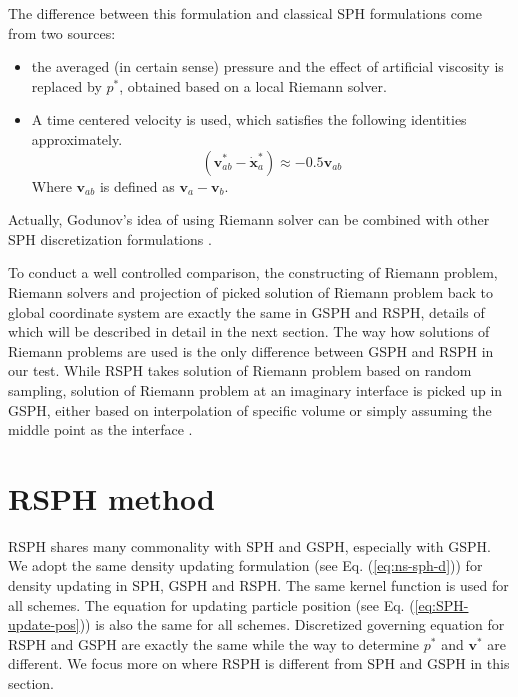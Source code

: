 \documentclass[review]{elsarticle}
\begin{document}
The difference between this formulation and classical SPH formulations come from two sources: 
\begin{itemize}
\item the averaged (in certain sense) pressure and the effect of artificial viscosity is replaced by  $p^{\ast}$, obtained based on a local Riemann solver.
\item A time centered velocity is used, which satisfies the following identities approximately. 
\begin{equation}
\left( \textbf{v}_{a b}^{\ast} - \dot{\textbf{x}}_{a}^{\ast} \right) \approx -0.5 \textbf{v}_{a b}
\label{eq:SPH-GSPH-difference2}
\end{equation}
Where $\textbf{v}_{a b}$ is defined as $\textbf{v}_a - \textbf{v}_b$.
\end{itemize}
Actually, Godunov's idea of using Riemann solver can be combined with other SPH discretization formulations \citep{cha2003implementations}. 

To conduct a well controlled comparison, the constructing of Riemann problem, Riemann solvers and projection of picked solution of Riemann problem back to global coordinate system are exactly the same in GSPH and RSPH, details of which will be described in detail in the next section. The way how solutions of Riemann problems are used is the only difference between GSPH and RSPH in our test. While RSPH takes solution of Riemann problem based on random sampling, solution of Riemann problem at an imaginary interface is picked up in GSPH, either based on interpolation of specific volume \citep{inutsuka2002reformulation} or simply assuming the middle point as the interface \citep{cha2003implementations}.


\section{RSPH method}
RSPH shares many commonality with SPH and GSPH, especially with GSPH. We adopt the same density updating formulation (see Eq. (\ref{eq:ns-sph-d})) for density updating in SPH, GSPH and RSPH. The same kernel function is used for all schemes. The equation for updating particle position (see Eq. (\ref{eq:SPH-update-pos})) is also the same for all schemes. Discretized governing equation for RSPH and GSPH are exactly the same while the way to determine $p^{\ast}$ and $\textbf{v}^{\ast}$ are different. We focus more on where RSPH is different from SPH and GSPH in this section.
\end{document}
